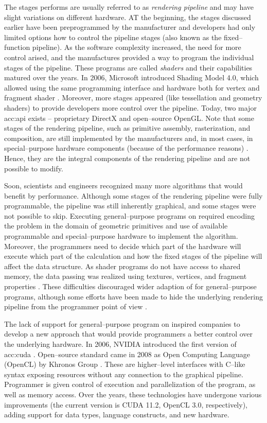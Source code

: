 The stages \gpu performs are usually referred to as \emph{rendering pipeline} and may have slight variations on different hardware. AT the beginning, the stages discussed earlier have been preprogrammed by the manufacturer and developers had only limited options how to control the pipeline stages (also known as the fixed--function pipeline). As the software complexity increased, the need for more control arised, and the manufactures provided a way to program the individual stages of the pipeline. These programs are called \emph{shaders} and their capabilities matured over the years. In 2006, Microsoft introduced Shading Model 4.0, which allowed using the same programming interface and hardware both for vertex and fragment shader \citep{DirectX10}. Moreover, more stages appeared (like tessellation and geometry shaders) to provide developers more control over the pipeline. Today, two major \acrshort{acc:api} exists -- proprietary  DirectX and open--source OpenGL. Note that some stages of the rendering pipeline, such as primitive assembly, rasterization, and composition, are still implemented by the \gpu manufacturers and, in most cases, in special--purpose hardware components (because of the performance reasons) \citep{SoftwareRasterization}. Hence, they are the integral components of the rendering pipeline and are not possible to modify.

Soon, scientists and engineers recognized many more algorithms that would benefit by \gpu performance. Although some stages of the rendering pipeline were fully programmable, the pipeline was still inherently graphical, and some stages were not possible to skip. Executing general--purpose programs on \gpu required encoding the problem in the domain of geometric primitives and use of available programmable and special--purpose hardware to implement the algorithm. Moreover, the programmers need to decide which part of the hardware will execute which part of the calculation and how the fixed stages of the pipeline will affect the data structure. As shader programs do not have access to shared memory, the data passing was realized using textures, vertices, and fragment properties \citep{GPUComputingOwens}. These difficulties discouraged wider adaption of \gpu for general--purpose programs, although some efforts have been made to hide the underlying rendering pipeline from the programmer point of view \citep{BrookGPU}.

The lack of support for general--purpose program on \gpu inspired companies to develop a new approach that would provide programmers a better control over the underlying hardware. In 2006, NVIDIA introduced the first version of \acrfull{acc:cuda} \citep{CUDAabout}. Open--source standard came in 2008 as Open Computing Language (OpenCL) by Khronos Group \citep{OpenCLRelease}. These are higher--level interfaces with C--like syntax exposing \gpu resources without any connection to the graphical pipeline. Programmer is given control of execution and parallelization of the program, as well as memory access. Over the years, these technologies have undergone various improvements (the current version is CUDA 11.2, OpenCL 3.0, respectively), adding support for data types, language constructs, and new hardware.

